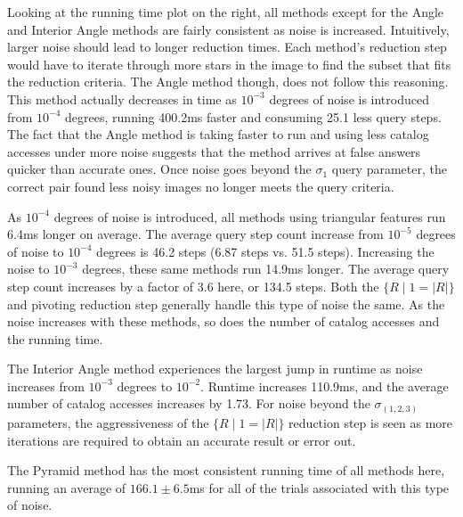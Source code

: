 Looking at the running time plot on the right, all methods except for the Angle and Interior Angle methods are fairly
consistent as noise is increased.
Intuitively, larger noise should lead to longer reduction times.
Each method's reduction step would have to iterate through more stars in the image to find the subset that fits the
reduction criteria.
The Angle method though, does not follow this reasoning.
This method actually decreases in time as $10^{-3}$ degrees of noise is introduced from $10^{-4}$ degrees, running
400.2ms faster and consuming 25.1 less query steps.
The fact that the Angle method is taking faster to run and using less catalog accesses under more noise suggests that
the method arrives at false answers quicker than accurate ones.
Once noise goes beyond the $\sigma_1$ query parameter, the correct pair found less noisy images no longer meets the
query criteria.

As $10^{-4}$ degrees of noise is introduced, all methods using triangular features run 6.4ms longer on average.
The average query step count increase from $10^{-5}$ degrees of noise to $10^{-4}$ degrees is 46.2 steps (6.87 steps vs.
51.5 steps).
Increasing the noise to $10^{-3}$ degrees, these same methods run 14.9ms longer.
The average query step count increases by a factor of 3.6 here, or 134.5 steps.
Both the $\{ R \mid 1 = |R| \}$ and pivoting reduction step generally handle this type of noise the same.
As the noise increases with these methods, so does the number of catalog accesses and the running time.

The Interior Angle method experiences the largest jump in runtime as noise increases from $10^{-3}$ degrees to $10^{-2}$.
Runtime increases 110.9ms, and the average number of catalog accesses increases by 1.73.
For noise beyond the $\sigma_{(1, 2, 3)}$ parameters, the aggressiveness of the $\{ R \mid 1 = |R| \}$ reduction step
is seen as more iterations are required to obtain an accurate result or error out.

The Pyramid method has the most consistent running time of all methods here, running an average of
$166.1 \pm 6.5$ms for all of the trials associated with this type of noise.

